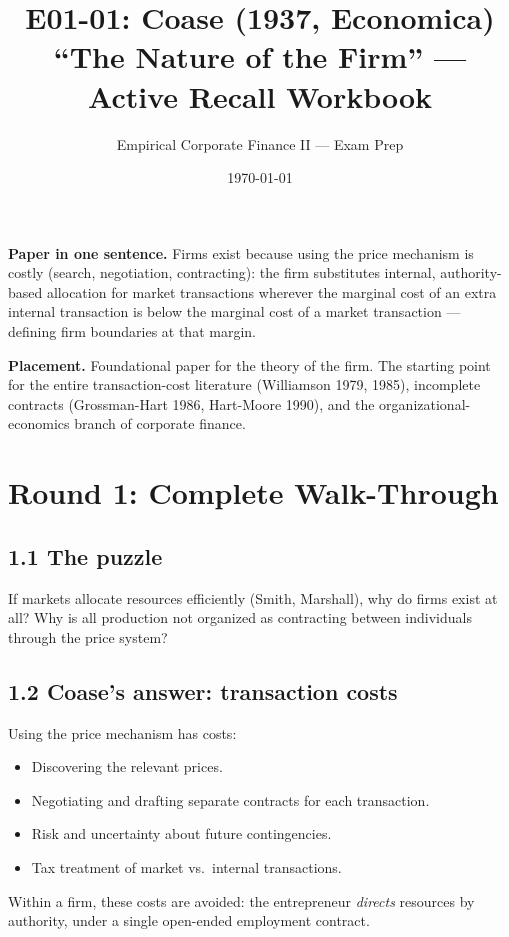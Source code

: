 \documentclass[11pt]{article}
\title{E01-01: Coase (1937, Economica) \\
\large ``The Nature of the Firm'' --- Active Recall Workbook}
\author{Empirical Corporate Finance II --- Exam Prep}
\date{\today}
\begin{document}
\maketitle

\begin{keybox}
\textbf{Paper in one sentence.} Firms exist because using the price mechanism is costly (search, negotiation, contracting): the firm substitutes internal, authority-based allocation for market transactions wherever the marginal cost of an extra internal transaction is below the marginal cost of a market transaction --- defining firm boundaries at that margin.

\textbf{Placement.} Foundational paper for the theory of the firm. The starting point for the entire transaction-cost literature (Williamson 1979, 1985), incomplete contracts (Grossman-Hart 1986, Hart-Moore 1990), and the organizational-economics branch of corporate finance.
\end{keybox}

\section*{Round 1: Complete Walk-Through}

\subsection*{1.1 The puzzle}
If markets allocate resources efficiently (Smith, Marshall), why do firms exist at all? Why is all production not organized as contracting between individuals through the price system?

\subsection*{1.2 Coase's answer: transaction costs}
Using the price mechanism has costs:
\begin{itemize}
\item Discovering the relevant prices.
\item Negotiating and drafting separate contracts for each transaction.
\item Risk and uncertainty about future contingencies.
\item Tax treatment of market vs.\ internal transactions.
\end{itemize}
Within a firm, these costs are avoided: the entrepreneur \emph{directs} resources by authority, under a single open-ended employment contract.
\end{document}
